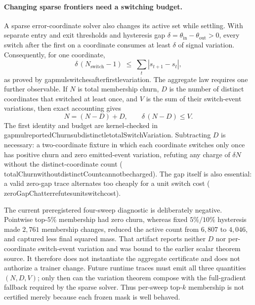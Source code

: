 \documentclass[11pt]{article}
\newcommand{\leanname}[1]{{\scriptsize\ttfamily
  \def\_{\textunderscore\allowbreak}#1}}
\begin{document}
\paragraph{Changing sparse frontiers need a switching budget.}
A sparse error-coordinate solver also changes its active set while settling. With
separate entry and exit thresholds and hysteresis gap
$\delta=\theta_{\mathrm{in}}-\theta_{\mathrm{out}}>0$, every switch after the first
on a coordinate consumes at least $\delta$ of signal variation. Consequently, for one
coordinate,
\[
  \delta\,(N_{\mathrm{switch}}-1)
  \;\leq\;\sum_t |s_{t+1}-s_t|,
\]
as proved by
\leanname{gap\_mul\_switches\_after\_first\_le\_variation}.
The aggregate law requires one further observable. If $N$ is total membership churn,
$D$ is the number of distinct coordinates that switched at least once, and $V$ is the
sum of their switch-event variations, then exact accounting gives
\[
  N=(N-D)+D,\qquad \delta\,(N-D)\leq V.
\]
The first identity and budget are kernel-checked in
\leanname{gap\_mul\_reportedChurn\_sub\_distinct\_le\_totalSwitch\allowbreak Variation}.
Subtracting $D$ is necessary: a two-coordinate fixture in which each coordinate switches
only once has positive churn and zero emitted-event variation, refuting any charge of
$\delta N$ without the distinct-coordinate count
(\leanname{totalChurn\_without\_distinctCount\_cannot\_be\_\allowbreak charged}).
The gap itself is also essential: a valid zero-gap trace alternates too cheaply for a
unit switch cost
(\leanname{zeroGapChatter\_refutes\_unit\_switch\_cost}).

The current preregistered four-sweep diagnostic is deliberately negative. Pointwise
top-$5\%$ membership had zero churn, whereas fixed $5\%/10\%$ hysteresis made $2{,}761$
membership changes, reduced the active count from $6{,}807$ to $4{,}046$, and captured
less final squared mass. That artifact reports neither $D$ nor per-coordinate
switch-event variation and was bound to the earlier scalar theorem source. It therefore
does not instantiate the aggregate certificate and does not authorize a trainer change.
Future runtime traces must emit all three quantities $(N,D,V)$; only then can the
variation theorem compose with the full-gradient fallback required by the sparse solver.
Thus per-sweep top-$k$ membership is not certified merely because each frozen mask is
well behaved.
\end{document}

